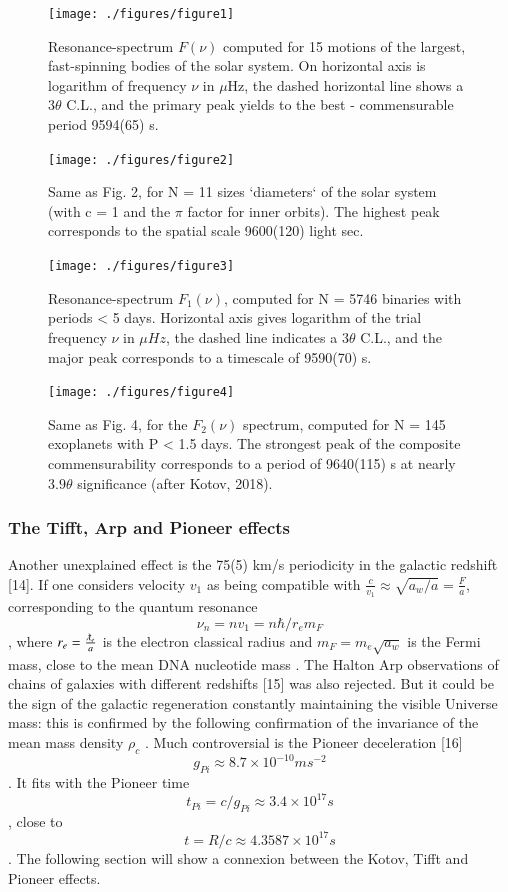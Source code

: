 \documentclass[twoside,draft]{article}
\begin{document}
\begin{sloppypar}
{\begin{figure}
\centering
\texttt{[image: ./figures/figure1]}
\caption{Resonance-spectrum $F(\nu)$ computed for 15 motions of the largest, fast-spinning bodies of
the solar system. On horizontal axis is logarithm of frequency $\nu$ in $\mu$Hz, the dashed horizontal line
shows a $ 3 \theta $ C.L., and the primary peak yields to the best - commensurable period 9594(65) s.}
\label{fig:figure_label}
\end{figure}

\begin{figure}
\centering
\texttt{[image: ./figures/figure2]}
\caption{Same as Fig. 2, for N = 11 sizes `diameters` of the solar system (with c = 1 and the $\pi$
factor for inner orbits). The highest peak corresponds to the spatial scale 9600(120) light sec.}
\label{fig:figure_label}
\end{figure}

\begin{figure}
\centering
\texttt{[image: ./figures/figure3]}
\caption{Resonance-spectrum $F_{1} ( \nu)$, computed for N = 5746 binaries with periods < 5 days.
Horizontal axis gives logarithm of the trial frequency $\nu$ in $\mu Hz$, the dashed line indicates a $3 \theta$
C.L., and the major peak corresponds to a timescale of 9590(70) s.}
\label{fig:figure_label}
\end{figure}

\begin{figure}
\centering
\texttt{[image: ./figures/figure4]}
\caption{Same as Fig. 4, for the $F_{2} ( \nu )$ spectrum, computed for N = 145 exoplanets with P < 1.5
days. The strongest peak of the composite commensurability corresponds to a period of 9640(115) s
at nearly $3.9\theta$ significance (after Kotov, 2018).}
\label{fig:figure_label}
\end{figure}


\subsubsection{The Tifft, Arp and Pioneer effects}

Another unexplained effect is the 75(5) km/s periodicity in the galactic redshift [14]. If one considers
velocity $v_{1}$ as being compatible with $\frac{c}{v_{1}} \approx \sqrt{a_{w} /a} = \frac{F}{a}$, corresponding to the quantum resonance $$\nu_{n} = nv_{1} =n\hbar /r_{e} m_{F} $$, where $r_{e} = \frac{\lambdabar_{e}}{a}$ is the electron classical radius and $m_{F} = m_{e}\sqrt{a_{w}}$ is the Fermi mass, close to the mean DNA nucleotide mass \cite{fm1}.
The Halton Arp observations of chains of galaxies with different redshifts [15] was also
rejected. But it could be the sign of the galactic regeneration constantly maintaining the visible
Universe mass: this is confirmed by the following confirmation of the invariance of the mean mass
density $\rho_{c}$ .
Much controversial is the Pioneer deceleration [16] $$g_{Pi} \approx 8.7 \times 10^{-10} ms^{-2}$$. It fits with
the Pioneer time $$t_{Pi} = c/g_{Pi} \approx 3.4 \times 10^{17} s$$, close to $$t = R/c \approx 4.3587 \times 10^{17} s$$. The following section will show a connexion between the Kotov, Tifft and Pioneer effects.

}
\end{sloppypar}
\end{document}

